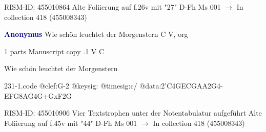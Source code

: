 \documentclass[twocolumn]{book}
\begin{document}
\newline RISM-ID: 455010864
\newline Alte Foliierung auf f.26v mit "27"
\newline D-Fh  Ms 001
\newline $\rightarrow$ In collection 418 (455008343)

\newline \par \vspace{7pt} \textcolor{darkblue}{\textbf{Anonymus  }}
\newline Wie schön leuchtet der Morgenstern  C  
\newline V, org
\newline \begin{itshape}\end{itshape} 
\newline \textcolor{darkblue}{}  1 parts  
\newline Manuscript copy
.1  V  C
\newline \begin{footnotesize} Wie schön leuchtet der Morgenstern \end{footnotesize}  
\begin{filecontents*}{231-1.code}
@clef:G-2
@keysig:
@timesig:c/
@data:2'C4GECGAA2G4-EFG{8AG}4G+GxF2G
\end{filecontents*}
\newline
%

\newline RISM-ID: 455010906
\newline Vier Textstrophen unter der Notentabulatur aufgeführt
\newline Alte Foliierung auf f.45v mit "44"
\newline D-Fh  Ms 001
\newline $\rightarrow$ In collection 418 (455008343)
\end{document}
